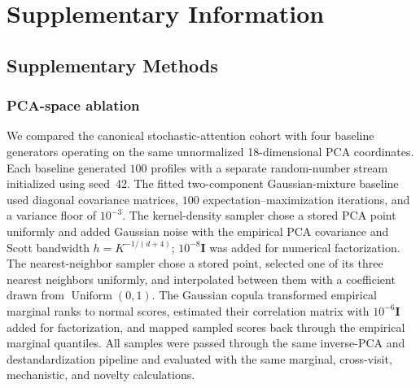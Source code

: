 
\setcounter{section}{0}
\setcounter{figure}{0}
\setcounter{table}{0}
\setcounter{equation}{0}
\renewcommand{\thesection}{S\arabic{section}}
\renewcommand{\thefigure}{S\arabic{figure}}
\renewcommand{\thetable}{S\arabic{table}}
\renewcommand{\theequation}{S\arabic{equation}}

\section*{Supplementary Information}

\subsection*{Supplementary Methods}

\subsubsection*{PCA-space ablation}

We compared the canonical stochastic-attention cohort with four baseline generators
operating on the same unnormalized 18-dimensional PCA coordinates. Each baseline generated
$100$ profiles with a separate random-number stream initialized using seed~42. The fitted
two-component Gaussian-mixture baseline used diagonal covariance matrices, $100$
expectation--maximization iterations, and a variance floor of $10^{-3}$. The kernel-density sampler chose
a stored PCA point uniformly and added Gaussian noise with the empirical PCA covariance and
Scott bandwidth $h=K^{-1/(d+4)}$; $10^{-8}\mathbf{I}$ was added for numerical factorization.
The nearest-neighbor sampler chose a stored point, selected one of its three nearest
neighbors uniformly, and interpolated between them with a coefficient drawn from
$\operatorname{Uniform}(0,1)$. The Gaussian copula transformed empirical marginal ranks to
normal scores, estimated their correlation matrix with $10^{-6}\mathbf{I}$ added for
factorization, and mapped sampled scores back through the empirical marginal quantiles. All
samples were passed through the same inverse-PCA and destandardization pipeline and evaluated
with the same marginal, cross-visit, mechanistic, and novelty calculations.

